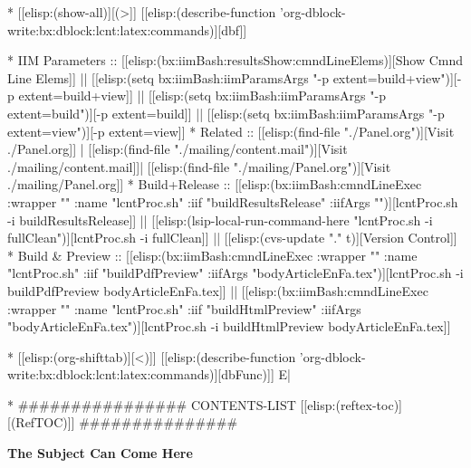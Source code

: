 \begin{whenOrg}
* [[elisp:(show-all)][(>]] [[elisp:(describe-function 'org-dblock-write:bx:dblock:lcnt:latex:commands)][dbf]]
\begin{whenOrg}
*      IIM Parameters    ::  [[elisp:(bx:iimBash:resultsShow:cmndLineElems)][Show Cmnd Line Elems]] || [[elisp:(setq bx:iimBash:iimParamsArgs "-p extent=build+view")][-p extent=build+view]] || [[elisp:(setq bx:iimBash:iimParamsArgs "-p extent=build")][-p extent=build]] || [[elisp:(setq bx:iimBash:iimParamsArgs "-p extent=view")][-p extent=view]]
*      Related           ::  [[elisp:(find-file "./Panel.org")][Visit ./Panel.org]] | [[elisp:(find-file "./mailing/content.mail")][Visit ./mailing/content.mail]]| [[elisp:(find-file "./mailing/Panel.org")][Visit ./mailing/Panel.org]]
*      Build+Release     ::  [[elisp:(bx:iimBash:cmndLineExec :wrapper "" :name "lcntProc.sh" :iif "buildResultsRelease" :iifArgs "")][lcntProc.sh -i buildResultsRelease]] || [[elisp:(lsip-local-run-command-here "lcntProc.sh -i fullClean")][lcntProc.sh -i fullClean]] || [[elisp:(cvs-update "." t)][Version Control]]
*      Build & Preview   ::  [[elisp:(bx:iimBash:cmndLineExec :wrapper "" :name "lcntProc.sh" :iif "buildPdfPreview" :iifArgs "bodyArticleEnFa.tex")][lcntProc.sh -i buildPdfPreview bodyArticleEnFa.tex]] || [[elisp:(bx:iimBash:cmndLineExec :wrapper "" :name "lcntProc.sh" :iif "buildHtmlPreview" :iifArgs "bodyArticleEnFa.tex")][lcntProc.sh -i buildHtmlPreview bodyArticleEnFa.tex]]

* [[elisp:(org-shifttab)][<)]] [[elisp:(describe-function 'org-dblock-write:bx:dblock:lcnt:latex:commands)][dbFunc)]]  E|
\end{whenOrg}

\begin{whenOrg}
*      ################ CONTENTS-LIST  [[elisp:(reftex-toc)][(RefTOC)]] ###############
\end{whenOrg}

\begin{comment}
** TODO [[elisp:(org-cycle)][| ]]  Idea      ::  Description   [[elisp:(org-cycle)][| ]]
\end{comment}

\begin{adjustwidth}{-0.35in}{-0.35in}
\begin{center}
  {\Large {\bf The Subject Can Come Here}}\\
\end{center}
\end{adjustwidth}



\end{whenOrg}
